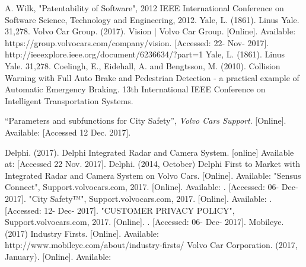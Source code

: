 \documentclass[conference]{IEEEtran}
\begin{document}
\begin{thebibliography}{00}
	 A. Wilk, "Patentability of Software", 2012 IEEE International Conference on Software Science, Technology and Engineering, 2012.
	 Yale, L. (1861). Linus Yale. 31,278.
	 Volvo Car Group. (2017). Vision | Volvo Car Group. [Online]. Available: https://group.volvocars.com/company/vision. 		[Accessed: 22- Nov- 2017].
	 http://ieeexplore.ieee.org/document/6236634/?part=1
	 Yale, L. (1861). Linus Yale. 31,278.
	 Coelingh, E., Eidehall, A. and Bengtsson, M. (2010). Collision Warning with Full Auto Brake and Pedestrian Detection - a practical example of Automatic Emergency Braking. 13th International IEEE Conference on Intelligent Transportation Systems.
	
	``Parameters and subfunctions for City Safety'', 
	\textit{Volvo Cars Support}. 
	[Online]. Available: 
	 [Accessed 12 Dec. 2017].
	
	 Delphi. (2017). Delphi Integrated Radar and Camera System. [online] Available at:  [Accessed 22 Nov. 2017].
	 Delphi. (2014, October) Delphi First to Market with Integrated Radar and Camera System on Volvo Cars. [Online]. Available: 
	 "Sensus Connect", Support.volvocars.com, 2017. [Online]. Available: . [Accessed: 06- Dec- 2017].
	 "City Safety™", Support.volvocars.com, 2017. [Online]. Available: . [Accessed: 12- Dec- 2017]. 
	 "CUSTOMER PRIVACY POLICY", Support.volvocars.com, 2017. [Online]. . [Accessed: 06- Dec- 2017].
	  Mobileye. (2017) Industry Firsts. [Online]. Available: http://www.mobileye.com/about/industry-firsts/
	 Volvo Car Corporation. (2017, January). [Online]. Available: 
	

\end{thebibliography}
\end{document}
